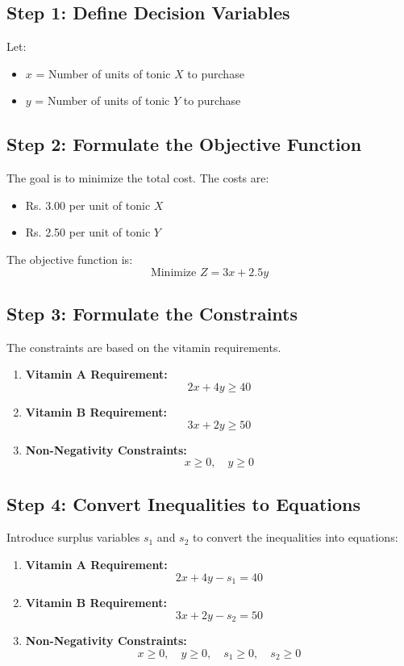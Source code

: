\documentclass{article}
\begin{document}
\subsection*{Step 1: Define Decision Variables}
Let:
\begin{itemize}
    \item \( x \) = Number of units of tonic \( X \) to purchase
    \item \( y \) = Number of units of tonic \( Y \) to purchase
\end{itemize}

\subsection*{Step 2: Formulate the Objective Function}
The goal is to minimize the total cost. The costs are:
\begin{itemize}
    \item Rs. 3.00 per unit of tonic \( X \)
    \item Rs. 2.50 per unit of tonic \( Y \)
\end{itemize}

The objective function is:
\[
\text{Minimize } Z = 3x + 2.5y
\]

\subsection*{Step 3: Formulate the Constraints}
The constraints are based on the vitamin requirements.

\begin{enumerate}
    \item \textbf{Vitamin A Requirement:}
    \[
    2x + 4y \geq 40
    \]
    
    \item \textbf{Vitamin B Requirement:}
    \[
    3x + 2y \geq 50
    \]
    
    \item \textbf{Non-Negativity Constraints:}
    \[
    x \geq 0, \quad y \geq 0
    \]
\end{enumerate}

\subsection*{Step 4: Convert Inequalities to Equations}
Introduce surplus variables \( s_1 \) and \( s_2 \) to convert the inequalities into equations:

\begin{enumerate}
    \item \textbf{Vitamin A Requirement:}
    \[
    2x + 4y - s_1 = 40
    \]
    
    \item \textbf{Vitamin B Requirement:}
    \[
    3x + 2y - s_2 = 50
    \]
    
    \item \textbf{Non-Negativity Constraints:}
    \[
    x \geq 0, \quad y \geq 0, \quad s_1 \geq 0, \quad s_2 \geq 0
    \]
\end{enumerate}
\end{document}
